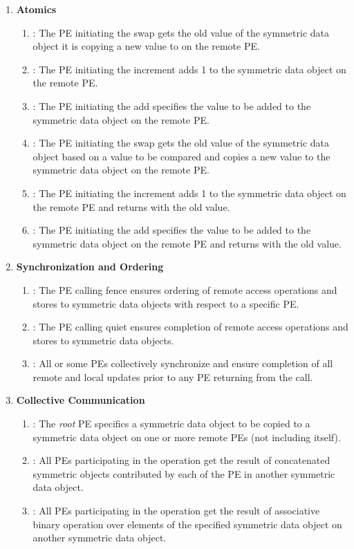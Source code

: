 \begin{enumerate}
\item \textbf{Atomics}
\begin{enumerate}
\item {}: The \ac{PE} initiating the swap gets the old value of the symmetric data object it is copying a new value to on the remote \ac{PE}.
\item {}: The \ac{PE} initiating the increment adds 1 to the symmetric data object on the remote \ac{PE}.
\item {}: The \ac{PE} initiating the add specifies the value to be added to the symmetric data object on the remote \ac{PE}.
\item {}: The \ac{PE} initiating the swap gets the old value of the symmetric data object based on a value to be compared and copies a new value to the symmetric data object on the remote \ac{PE}.
\item {}: The \ac{PE} initiating the increment adds 1 to the symmetric data object on the remote \ac{PE} and returns with the old value.
\item {}: The \ac{PE} initiating the add specifies the value to be added to the symmetric data object on the remote \ac{PE} and returns with the old value.
\end{enumerate}

\item \textbf{Synchronization and Ordering}
\begin{enumerate}
\item {}: The \ac{PE} calling fence ensures ordering of remote access operations and stores to symmetric data objects with respect to a specific \target{} \ac{PE}. 
\item {}: The \ac{PE} calling quiet ensures completion of remote access operations and stores to symmetric data objects. 
\item {}: All or some \ac{PE}s collectively synchronize and ensure completion of all remote and local updates prior to any \ac{PE} returning from the call.
\end{enumerate}

\item \textbf{Collective Communication}
\begin{enumerate}
\item {}: The \textit{root} \ac{PE} specifics a symmetric data object to be copied to a symmetric data object on one or more remote \ac{PE}s (not including itself). 
\item {}: All \ac{PE}s participating in the operation get the result of concatenated symmetric objects contributed by each of the \ac{PE} in another symmetric data object.
\item {}: All \ac{PE}s participating in the operation get the result of associative binary operation over elements of the specified symmetric data object on another symmetric data object. 
\end{enumerate}


\end{enumerate}
